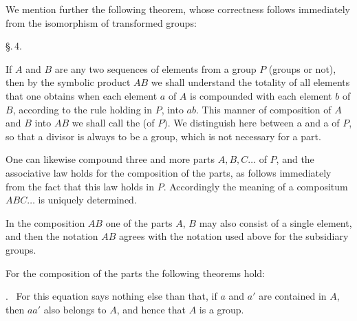 
We mention further the following theorem, whose correctness follows immediately from
the isomorphism of transformed groups:


\begin{center}
\S.\,4.

\end{center}

If $A$ and $B$ are any two sequences of elements from a group $P$
(groups or not), then by the symbolic product $AB$ we shall understand
the totality of all elements that one obtains when each element $a$ of $A$
is compounded with each element $b$ of $B$, according to the rule holding
in $P$, into $ab$. This manner of composition of
$A$ and $B$ into $AB$ we shall call the  (of $P$).
We distinguish here between a  and a  of
$P$, so that a divisor is always to be a group, which is not necessary
for a part.

One can likewise compound three and more parts $A, B, C \ldots$ of $P$,
and the associative law holds for the composition of the parts, as
follows immediately from the fact that this law holds in $P$. Accordingly the
meaning of a compositum $ABC \ldots$ is uniquely determined.

In the composition $AB$ one of the parts $A$, $B$ may also consist of a
single element, and then the notation $AB$ agrees with the notation
used above for the subsidiary groups.

For the composition of the parts the following theorems hold:

.\ 
For this equation says nothing else than that, if $a$ and $a'$ are contained in
$A$, then $aa'$ also belongs to $A$, and hence that $A$ is a group.
